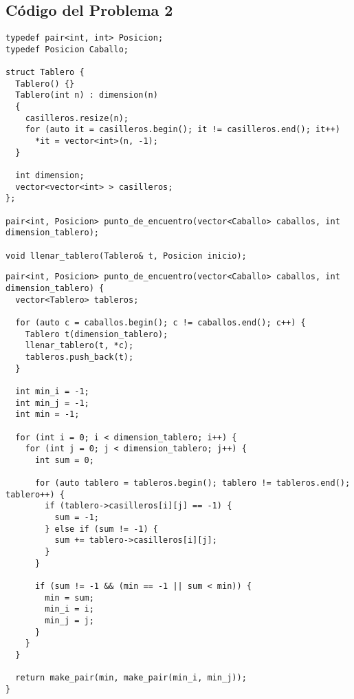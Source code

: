 \documentclass[a4paper]{article}
\begin{document}







\subsection{Código del Problema 2}


\begin{lstlisting}
typedef pair<int, int> Posicion;
typedef Posicion Caballo;

struct Tablero {
  Tablero() {}
  Tablero(int n) : dimension(n)
  {
    casilleros.resize(n);
    for (auto it = casilleros.begin(); it != casilleros.end(); it++)
      *it = vector<int>(n, -1);
  }

  int dimension;
  vector<vector<int> > casilleros;
};

pair<int, Posicion> punto_de_encuentro(vector<Caballo> caballos, int dimension_tablero);

void llenar_tablero(Tablero& t, Posicion inicio);
\end{lstlisting}


\vspace*{0.5cm}


\begin{lstlisting}
pair<int, Posicion> punto_de_encuentro(vector<Caballo> caballos, int dimension_tablero) {
  vector<Tablero> tableros;

  for (auto c = caballos.begin(); c != caballos.end(); c++) {
    Tablero t(dimension_tablero);
    llenar_tablero(t, *c);
    tableros.push_back(t);
  }

  int min_i = -1;
  int min_j = -1;
  int min = -1;

  for (int i = 0; i < dimension_tablero; i++) {
    for (int j = 0; j < dimension_tablero; j++) {
      int sum = 0;

      for (auto tablero = tableros.begin(); tablero != tableros.end(); tablero++) {
        if (tablero->casilleros[i][j] == -1) {
          sum = -1;
        } else if (sum != -1) {
          sum += tablero->casilleros[i][j];
        }
      }

      if (sum != -1 && (min == -1 || sum < min)) {
        min = sum;
        min_i = i;
        min_j = j;
      }
    }
  }

  return make_pair(min, make_pair(min_i, min_j));
}
\end{lstlisting}
\end{document}
